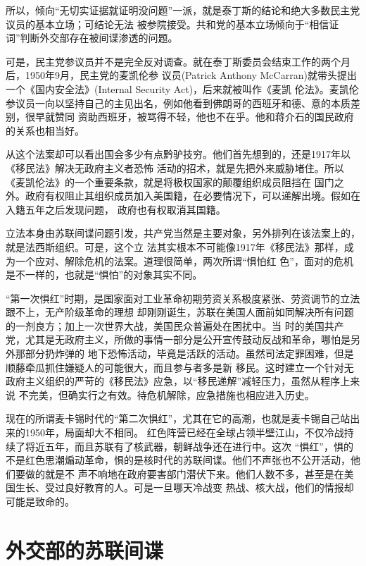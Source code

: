 \documentclass[10pt]{article}
\begin{document}
{所以，倾向``无切实证据就证明没问题''一派，就是泰丁斯的结论和绝大多数民主党议员的基本立场；可结论无法
被参院接受。共和党的基本立场倾向于``相信证词''判断外交部存在被间谍渗透的问题。

可是，民主党参议员并不是完全反对调查。就在泰丁斯委员会结束工作的两个月后，1950年9月，民主党的麦凯伦参
议员(Patrick Anthony McCarran)就带头提出一个《国内安全法》(Internal Security Act)，后来就被叫作《麦凯
伦法》。麦凯伦参议员一向以坚持自己的主见出名，例如他看到佛朗哥的西班牙和德、意的本质差别，很早就赞同
资助西班牙，被骂得不轻，他也不在乎。他和蒋介石的国民政府的关系也相当好。

从这个法案却可以看出国会多少有点黔驴技穷。他们首先想到的，还是1917年以《移民法》解决无政府主义者恐怖
活动的招术，就是先把外来威胁堵住。所以《麦凯伦法》的一个重要条款，就是将极权国家的颠覆组织成员阻挡在
国门之外。政府有权阻止其组织成员加入美国籍，在必要情况下，可以递解出境。假如在入籍五年之后发现问题，
政府也有权取消其国籍。

立法本身由苏联间谍问题引发，共产党当然是主要对象，另外排列在该法案上的，就是法西斯组织。可是，这个立
法其实根本不可能像1917年《移民法》那样，成为一个应对、解除危机的法案。道理很简单，两次所谓``惧怕红
色''，面对的危机是不一样的，也就是``惧怕''的对象其实不同。

 ``第一次惧红''时期，是国家面对工业革命初期劳资关系极度紧张、劳资调节的立法跟不上，无产阶级革命的理想
却刚刚诞生，苏联在美国人面前如同解决所有问题的一剂良方；加上一次世界大战，美国民众普遍处在困扰中。当
时的美国共产党，尤其是无政府主义，所做的事情一部分是公开宣传鼓动反战和革命，哪怕是另外那部分扔炸弹的
地下恐怖活动，毕竟是活跃的活动。虽然司法定罪困难，但是顺藤牵瓜抓住嫌疑人的可能很大，而且参与者多是新
移民。这时建立一个针对无政府主义组织的严苛的《移民法》应急，以``移民递解''减轻压力，虽然从程序上来说
不完美，但确实行之有效。待危机解除，应急措施也相应进入历史。

现在的所谓麦卡锡时代的``第二次惧红''，尤其在它的高潮，也就是麦卡锡自己站出来的1950年，局面却大不相同。
红色阵营已经在全球占领半壁江山，不仅冷战持续了将近五年，而且苏联有了核武器，朝鲜战争还在进行中。这次
``惧红''，惧的不是红色思潮煽动革命，惧的是核时代的苏联间谍。他们不声张也不公开活动，他们要做的就是不
声不响地在政府要害部门潜伏下来。他们人数不多，甚至是在美国生长、受过良好教育的人。可是一旦哪天冷战变
热战、核大战，他们的情报却可能是致命的。

\pagebreak
\section{外交部的苏联间谍}

}
\end{document}
